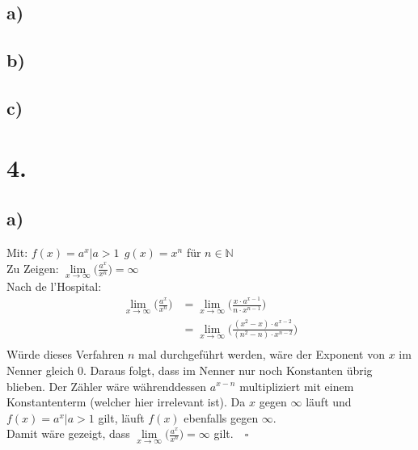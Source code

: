 \documentclass[a4paper]{scrartcl}
\newcommand{\qed}{\quad \square}
\begin{document}
\subsection{a)}
\subsection{b)}
\subsection{c)}
\newpage
\section{4.}
\subsection{a)}
Mit: \(f(x)=a^x |a>1\ \ g(x)=x^n\) für \(n\in \mathbb{N}\)\\
Zu Zeigen: \(\lim\limits_{x\to\infty}\bigg(\frac{a^x}{x^n}\bigg)=\infty\)\\
Nach de l'Hospital:
\begin{align}
\lim\limits_{x\to\infty}\bigg(\frac{a^x}{x^n}\bigg)&=\lim\limits_{x\to\infty}\bigg(\frac{x\cdot a^{x-1}}{n\cdot x^{n-1}}\bigg)\\
	&=\lim\limits_{x\to\infty}\bigg(\frac{(x^2-x)\cdot a^{x-2}}{(n^2-n)\cdot x^{n-2}}\bigg)\\
\end{align}
Würde dieses Verfahren \(n\) mal durchgeführt werden, wäre der Exponent von \(x\) im Nenner gleich 0. Daraus folgt, dass im Nenner nur noch Konstanten übrig blieben. Der Zähler wäre währenddessen \(a^{x-n}\) multipliziert mit einem Konstantenterm (welcher hier irrelevant ist). Da \(x\) gegen  \(\infty\) läuft und \(f(x)=a^x|a>1\) gilt, läuft \(f(x)\) ebenfalls gegen \(\infty\).\\
Damit wäre gezeigt, dass \(\lim\limits_{x\to\infty}\bigg(\frac{a^x}{x^n}\bigg)=\infty\) gilt.\(\qed\)
\end{document}
